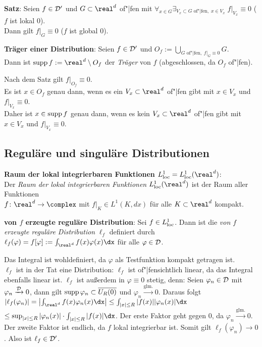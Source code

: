 \textbf{Satz}:
Seien $f \in \mathcal{D}'$ und $G \subset \real^d$ of"|fen mit
$\forall_{x \in G} \exists_{V_x \subset G \text{ of"|fen},\; x \in V_x}\;
f|_{V_x} \equiv 0$
($f$ ist lokal $0$).\\
Dann gilt $f|_G \equiv 0$
($f$ ist global $0$).

\textbf{Träger einer Distribution}:
Seien $f \in \mathcal{D}'$ und
$O_f := \bigcup_{G \text{ of"|fen},\; f|_G \equiv 0} G$.\\
Dann ist $\supp f := \real^d \setminus O_f$ der \emph{Träger} von $f$
(abgeschlossen, da $O_f$ of"|fen).

Nach dem Satz gilt $f|_{O_f} \equiv 0$.\\
Es ist $x \in O_f$ genau dann, wenn es ein
$V_x \subset \real^d$ of"|fen gibt mit $x \in V_x$ und $f|_{V_x} \equiv 0$.\\
Daher ist $x \in \operatorname{supp} f$ genau dann, wenn es kein
$V_x \subset \real^d$ of"|fen gibt mit $x \in V_x$ und $f|_{V_x} \equiv 0$.

\pagebreak

\subsection{%
    Reguläre und singuläre Distributionen%
}

\textbf{Raum der lokal integrierbaren Funktionen
$L^1_\loc = L^1_\loc(\real^d)$}:\\
Der \emph{Raum der lokal integrierbaren Funktionen $L^1_\loc(\real^d)$} ist
der Raum aller Funktionen\\
$f\colon \real^d \rightarrow \complex$ mit
$f|_K \in L^1(K, dx)$ für alle $K \subset \real^d$ kompakt.

\textbf{von $f$ erzeugte reguläre Distribution}:
Sei $f \in L^1_{{\operatorname{loc}}}$.
Dann ist die \emph{von $f$ erzeugte reguläre Distribution} $\ell_f$ definiert
durch $\ell_f(\varphi) = f[\varphi] := \int_{\real^d} f(x) \varphi(x) \dx$
für alle $\varphi \in \mathcal{D}$.

Das Integral ist wohldefiniert, da $\varphi$ als Testfunktion
kompakt getragen ist.\\
$\ell_f$ ist in der Tat eine Distribution:
$\ell_f$ ist of"|fensichtlich linear, da das Integral ebenfalls linear ist.
$\ell_f$ ist außerdem in $\varphi \equiv 0$ stetig, denn:
Seien $\varphi_n \in \mathcal{D}$ mit $\varphi_n \xrightarrow{\mathcal{D}} 0$,
dann gilt $\operatorname{supp} \varphi_n \subset \overline{U_R(0)}$ und
$\varphi_n \xrightarrow{\text{glm.}} 0$.
Daraus folgt $|\ell_f(\varphi_n)| =
\left|\int_{\real^d} f(x) \varphi_n(x) \dx\right| \le
\int_{|x| \le R} |f(x)| |\varphi_n(x)| \dx$\\
$\le \sup_{|x| \le R} |\varphi_n(x)| \cdot \int_{|x| \le R} |f(x)| \dx$.
Der erste Faktor geht gegen $0$, da $\varphi_n \xrightarrow{\text{glm.}} 0$.
Der zweite Faktor ist endlich, da $f$ lokal integrierbar ist.
Somit gilt $\ell_f(\varphi_n) \to 0$.
Also ist $\ell_f \in \mathcal{D}'$.


